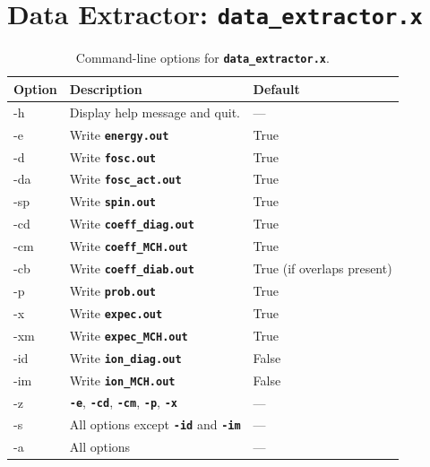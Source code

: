 \documentclass[a4paper,10pt,DIV=15,openany,twoside=false]{scrbook}
\newcommand{\ttt}[1]{\textbf{\texttt{#1}}}
\begin{document}
\section{Data Extractor: \ttt{data\_extractor.x}}\label{sec:data_extractor.x}

\begin{table}[tb]
  \centering
  \caption{Command-line options for \ttt{data\_extractor.x}.}
  \label{tab:dataextractor_options}
  \begin{tabular}{>{\ttfamily}lll}
    \toprule
    \rmfamily Option        &Description      &Default\\
    \midrule
    -h          &Display help message and quit.                         &---                      \\
    -e          &Write \ttt{energy.out}                                 &True                     \\
    -d          &Write \ttt{fosc.out}                                   &True                     \\
    -da         &Write \ttt{fosc\_act.out}                              &True                     \\
    -sp         &Write \ttt{spin.out}                                   &True                     \\
    -cd         &Write \ttt{coeff\_diag.out}                            &True                     \\
    -cm         &Write \ttt{coeff\_MCH.out}                             &True                     \\
    -cb         &Write \ttt{coeff\_diab.out}                            &True (if overlaps present) \\
    -p          &Write \ttt{prob.out}                                   &True                     \\
    -x          &Write \ttt{expec.out}                                  &True                     \\
    -xm         &Write \ttt{expec\_MCH.out}                             &True                     \\
    -id         &Write \ttt{ion\_diag.out}                              &False                    \\
    -im         &Write \ttt{ion\_MCH.out}                               &False                    \\
    -z          &\ttt{-e}, \ttt{-cd}, \ttt{-cm}, \ttt{-p}, \ttt{-x}     &---                      \\
    -s          &All options except \ttt{-id} and \ttt{-im}             &---                      \\
    -a          &All options                                            &---                      \\
    \bottomrule
  \end{tabular}
\end{table}
\end{document}
